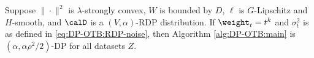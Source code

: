 \begin{theorem}
\label{thm:DP-OTB:main-privacy}
Suppose $\|\cdot\|^2$ is $\lambda$-strongly convex, $W$ is bounded by $D$, $\ell$ is $G$-Lipschitz and $H$-smooth, and $\calD$ is a $(V,\alpha)$-RDP distribution. If $\weight_t = t^k$ and $\sigma_t^2$ is as defined in \eqref{eq:DP-OTB:RDP-noise}, then Algorithm \ref{alg:DP-OTB:main} is $(\alpha,\alpha\rho^2/2)$-DP for all datasets $Z$.
\end{theorem}